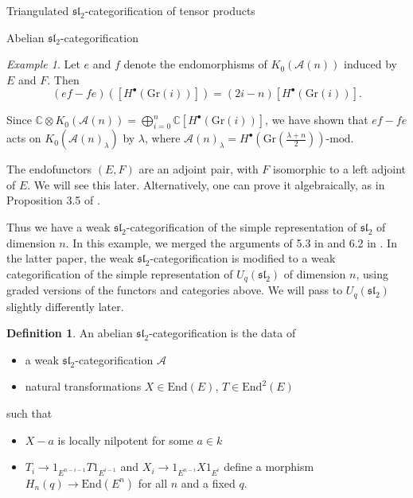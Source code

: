 \documentclass[12pt]{amsart}
\theoremstyle{definition}
\newtheorem{defn}[thm]{Definition}
\theoremstyle{remark}
\theoremstyle{remark}
\newtheorem{ex}[thm]{Example}
\begin{document}
\begin{section}{Triangulated $\mathfrak{sl}_{2}$-categorification of tensor products}
\begin{subsection}{Abelian $\mathfrak{sl}_{2}$-categorification}
\begin{ex}
Let $e$ and $f$ denote the endomorphisms of $K_{0}(\mathcal{A}(n))$ induced by $E$ and $F$. Then \[ (ef -fe)(\left[ H^{\bullet}(\text{Gr}(i)) \right]) = (2i-n)\left[ H^{\bullet}(\text{Gr}(i)) \right]. \] 

Since $\mathbb{C} \otimes K_{0}(\mathcal{A}(n)) = \bigoplus_{i=0}^{n} \mathbb{C}\left[ H^{\bullet}(\text{Gr}(i)) \right]$, we have shown that $ef -fe$ acts on $K_{0}(\mathcal{A}(n)_{\lambda})$ by $\lambda$, where $\mathcal{A}(n)_{\lambda} = H^{\bullet}(\text{Gr}(\frac{\lambda + n}{2}))\text{-mod}$.  

The endofunctors $(E,F)$ are an adjoint pair, with $F$ isomorphic to a left adjoint of $E$. We will see this later. Alternatively, one can prove it algebraically, as in Proposition 3.5 of \cite{FrenkelKhovanovStroppelCategorificationFiniteDimensionalIrreducibleRepresentationsQuantumSl2TensorProducts}. 

Thus we have a weak $\mathfrak{sl}_{2}$-categorification of the simple representation of $\mathfrak{sl}_{2}$ of dimension $n$. In this example, we merged the arguments of 5.3 in \cite{ChuangRouquierDerivedEquivalencesSymmetricGroupsCategorification} and 6.2 in \cite{FrenkelKhovanovStroppelCategorificationFiniteDimensionalIrreducibleRepresentationsQuantumSl2TensorProducts}. In the latter paper, the weak $\mathfrak{sl}_{2}$-categorification is modified to a weak categorification of the simple representation of $U_{q}(\mathfrak{sl}_{2})$ of dimension $n$, using graded versions of the functors and categories above. We will pass to $U_{q}(\mathfrak{sl}_{2})$ slightly differently later.
\end{ex}

\begin{defn} An abelian $\mathfrak{sl}_{2}$-categorification is the data of \begin{itemize} \item a weak $\mathfrak{sl}_{2}$-categorification $\mathcal{A}$ \item natural transformations $X \in \text{End}(E)$, $T \in \text{End}^{2}(E)$ \end{itemize} such that \begin{itemize} \item $X -a$ is locally nilpotent for some $a \in k$ \item $T_{i} \rightarrow 1_{E^{n-i-1}}T1_{E^{i-1}}$ and $X_{i} \rightarrow 1_{E^{n-i}}X1_{E^{i}}$ define a morphism $H_{n}(q) \rightarrow \text{End}(E^{n})$ for all $n$ and a fixed $q$. \end{itemize} \end{defn}


\end{subsection}
\end{section}
\end{document}
